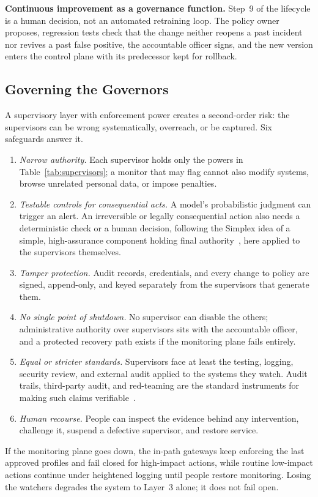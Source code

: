 \documentclass{ieeeaccess}
\begin{document}
\textbf{Continuous improvement as a governance function.} Step~9 of the lifecycle is a human decision, not an automated retraining loop. The policy owner proposes, regression tests check that the change neither reopens a past incident nor revives a past false positive, the accountable officer signs, and the new version enters the control plane with its predecessor kept for rollback.

\subsection{Governing the Governors}
\label{sec:hacof-governors}

A supervisory layer with enforcement power creates a second-order risk: the supervisors can be wrong systematically, overreach, or be captured. Six safeguards answer it.
\begin{enumerate}
  \item \textit{Narrow authority.} Each supervisor holds only the powers in Table~\ref{tab:supervisors}; a monitor that may flag cannot also modify systems, browse unrelated personal data, or impose penalties.
  \item \textit{Testable controls for consequential acts.} A model's probabilistic judgment can trigger an alert. An irreversible or legally consequential action also needs a deterministic check or a human decision, following the Simplex idea of a simple, high-assurance component holding final authority~\cite{sha2001simplex}, here applied to the supervisors themselves.
  \item \textit{Tamper protection.} Audit records, credentials, and every change to policy are signed, append-only, and keyed separately from the supervisors that generate them.
  \item \textit{No single point of shutdown.} No supervisor can disable the others; administrative authority over supervisors sits with the accountable officer, and a protected recovery path exists if the monitoring plane fails entirely.
  \item \textit{Equal or stricter standards.} Supervisors face at least the testing, logging, security review, and external audit applied to the systems they watch. Audit trails, third-party audit, and red-teaming are the standard instruments for making such claims verifiable~\cite{brundage2020trustworthy}.
  \item \textit{Human recourse.} People can inspect the evidence behind any intervention, challenge it, suspend a defective supervisor, and restore service.
\end{enumerate}
If the monitoring plane goes down, the in-path gateways keep enforcing the last approved profiles and fail closed for high-impact actions, while routine low-impact actions continue under heightened logging until people restore monitoring. Losing the watchers degrades the system to Layer~3 alone; it does not fail open.
\end{document}
